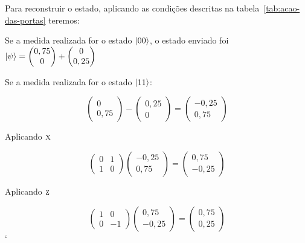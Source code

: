 Para reconstruir o estado, aplicando as condições descritas na tabela~\ref{tab:acao-das-portas} teremos:

Se a medida realizada for o estado $\ket{00}$, o estado enviado foi $\ket{\psi} = \begin{pmatrix}
0,75 \\
0
\end{pmatrix} +  \begin{pmatrix}
0 \\
0,25
\end{pmatrix}$	

Se a medida realizada for o estado $\ket{11}$:

\begin{equation}
\begin{pmatrix}
0 \\
0,75
\end{pmatrix} -  \begin{pmatrix}
0,25 \\
0
\end{pmatrix} = \begin{pmatrix}
-0,25 \\
0,75
\end{pmatrix}
\end{equation}

Aplicando \(\operatorname{\textsc{x}}\)

\begin{equation}
\begin{pmatrix}
0 & 1 \\
1 & 0
\end{pmatrix} \begin{pmatrix}
-0,25 \\
0,75
\end{pmatrix} = \begin{pmatrix}
0,75 \\
-0,25
\end{pmatrix}
\end{equation}

Aplicando \(\operatorname{\textsc{z}}\)

\begin{equation}
\begin{pmatrix}
1 & 0 \\
0 & -1
\end{pmatrix}\begin{pmatrix}
0,75 \\
-0,25
\end{pmatrix} = \begin{pmatrix}
0,75 \\
0,25
\end{pmatrix}
\end{equation}`

